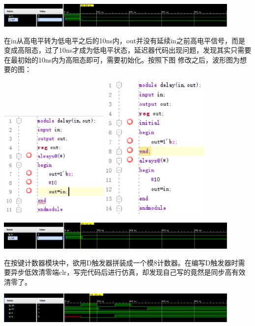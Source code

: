 \documentclass[a4paper,11pt]{ctexart}
\begin{document}
\includegraphics[width=0.9\textwidth]{./images/Lsim1.eps}

在in从高电平转为低电平之后的10ns内，out并没有延续in之前高电平信号，而是变成高阻态，过了10ns才成为低电平状态，延迟器代码出现问题，发现其实只需要在最初始的10ns内为高阻态即可，需要初始化。按照下图
修改之后，波形图为想要的图：

\includegraphics[width=0.4\textwidth]{./images/Lchange1.eps}
\includegraphics[width=0.4\textwidth]{./images/Lchange2.eps}

\includegraphics[width=0.9\textwidth]{./images/Lsim2.eps}

在按键计数器模块中，欲用D触发器拼装成一个模8计数器。在编写D触发器时需要异步低效清零端clr，写完代码后进行仿真，却发现自己写的竟然是同步高有效清零了。

\includegraphics[width=0.9\textwidth]{./images/Lsim3.eps}
\end{document}
